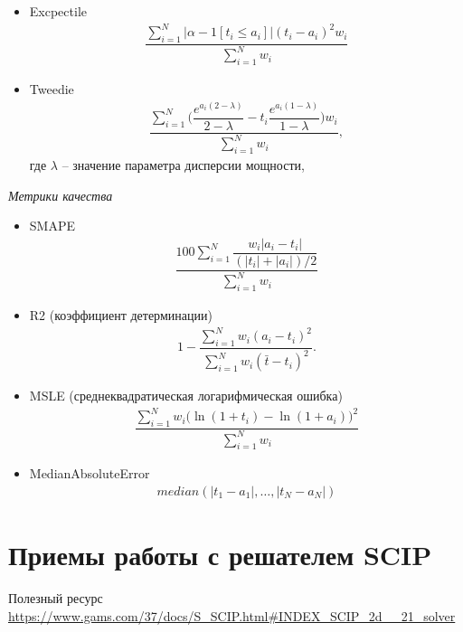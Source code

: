 \documentclass[%
	11pt,
	a4paper,
	utf8,
		]{article}
\begin{document}
\begin{itemize}
\item Excpectile
\begin{align*}
	\dfrac{ \sum\limits_{i=1}^N | \alpha - 1[t_i \leqslant a_i] | (t_i - a_i)^2 w_i }{ \sum\limits_{i=1}^N w_i }
\end{align*}

\item Tweedie
\begin{align*}
	\dfrac{ \sum\limits_{i=1}^N \Big( \dfrac{e^{a_i (2 - \lambda)}}{2 - \lambda} - t_i \dfrac{ e^{a_i ( 1 - \lambda)} }{ 1 - \lambda } \Big) w_i }{ \sum\limits_{i=1}^N w_i },
\end{align*}
где $ \lambda $ -- значение параметра дисперсии мощности,
\end{itemize}

\emph{Метрики качества}

\begin{itemize}
	\item SMAPE
\begin{align*}
	\dfrac{ 100 \sum\limits_{i=1}^N \dfrac{ w_i | a_i - t_i | }{ (|t_i| + |a_i|)/2 } }{ \sum\limits_{i=1}^N w_i }
\end{align*}

    \item R2 (коэффициент детерминации)
\begin{align*}
	1 - \dfrac{ \sum\limits_{i=1}^N w_i (a_i - t_i)^2 }{ \sum\limits_{i=1}^N w_i (\bar{t} - t_i)^2 }.
\end{align*}

    \item MSLE (среднеквадратическая логарифмическая ошибка)
\begin{align*}
	\dfrac{ \sum\limits_{i=1}^N w_i \big( \ln (1 + t_i) - \ln (1 + a_i) \big)^2 }{ \sum\limits_{i=1}^N w_i }
\end{align*}

    \item MedianAbsoluteError
\begin{align*}
	median(|t_1 - a_1|, \ldots, |t_N - a_N|)
\end{align*}
\end{itemize}


\section{Приемы работы с решателем SCIP}

Полезный ресурс \url{https://www.gams.com/37/docs/S_SCIP.html#INDEX_SCIP_2d__21_solver}
\end{document}
